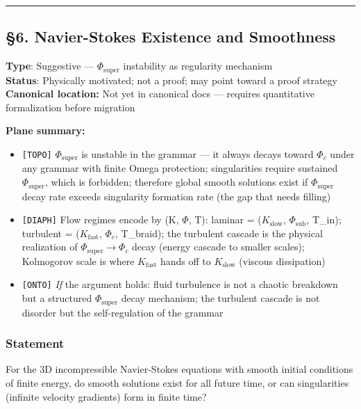 \documentclass[12pt,a4paper]{article}
\newcommand{\pilcrow}{\S}
\begin{document}
\begin{center}
\rule{0.5\textwidth}{0.4pt}
\end{center}

\subsection{\pilcrow{}6. Navier-Stokes Existence and Smoothness}

\textbf{Type}: Suggestive --- $\Phi_{\text{super}}$ instability as regularity mechanism   \\
\textbf{Status}: Physically motivated; not a proof; may point toward a proof strategy   \\
\textbf{Canonical location:} Not yet in canonical docs --- requires quantitative formalization before migration

\textbf{Plane summary:}

\begin{itemize}
    \item \texttt{{[}TOPO{]}} $\Phi_{\text{super}}$ is unstable in the grammar --- it always decays toward $\Phi_c$ under any grammar with finite Omega protection; singularities require sustained $\Phi_{\text{super}}$, which is forbidden; therefore global smooth solutions exist if $\Phi_{\text{super}}$ decay rate exceeds singularity formation rate (the gap that needs filling)
    \item \texttt{{[}DIAPH{]}} Flow regimes encode by (K, $\Phi$, T): laminar = ($K_{\text{slow}}$, $\Phi_{\text{sub}}$, T\_in); turbulent = ($K_{\text{fast}}$, $\Phi_c$, T\_braid); the turbulent cascade is the physical realization of $\Phi_{\text{super}} \to \Phi_c$ decay (energy cascade to smaller scales); Kolmogorov scale is where $K_{\text{fast}}$ hands off to $K_{\text{slow}}$ (viscous dissipation)
    \item \texttt{{[}ONTO{]}} \emph{If} the argument holds: fluid turbulence is not a chaotic breakdown but a structured $\Phi_{\text{super}}$ decay mechanism; the turbulent cascade is not disorder but the self-regulation of the grammar
\end{itemize}

\subsubsection{Statement}

For the 3D incompressible Navier-Stokes equations with smooth initial conditions of finite energy, do smooth solutions exist for all future time, or can singularities (infinite velocity gradients) form in finite time?
\end{document}

